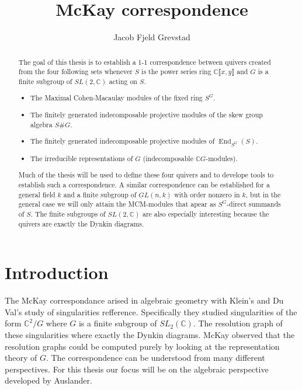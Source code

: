 \documentclass[11pt, a4paper, english]{article}
\numberwithin{prop}{section}
\numberwithin{lemma}{section}
\numberwithin{theorem}{section}
\numberwithin{defin}{section}
\numberwithin{example}{section}
\newcommand{\C}{\mathbb{C}}
\DeclareMathOperator{\End}{End}
\begin{document}
\title{McKay correspondence}
\author{Jacob Fjeld Grevstad}
\maketitle

\begin{abstract}
The goal of this thesis is to establish a 1-1 correspondence between quivers created from the four following sets whenever $S$ is the power series ring $\C \llbracket x, y \rrbracket$ and $G$ is a finite subgroup of $SL(2,\C)$ acting on $S$.
\begin{itemize}
\item The Maximal Cohen-Macaulay modules of the fixed ring $S^G$.
\item The finitely generated indecomposable projective modules of the skew group algebra $S\#G$.
\item The finitely generated indecomposable projective modules of $\End_{S^G}(S)$.
\item The irreducible representations of $G$ (indecomposable $\C G$-modules).
\end{itemize}
Much of the thesis will be used to define these four quivers and to develope tools to establish such a correspondence. A similar correspondence can be established for a general field $k$ and a finite subgroup of $GL(n, k)$ with order nonzero in $k$, but in the general case we will only attain the MCM-modules that apear as $S^G$-direct summands of $S$. The finite subgroups of $SL(2, \C)$ are also especially interesting because the quivers are exactly the Dynkin diagrams.
\end{abstract}

\tableofcontents

\section*{Introduction}
The McKay correspondance arised in algebraic geometry with Klein's and Du Val's study of singularities {\color{red} refference}. Specifically they studied singularities of the form $\C^2 / G$ where $G$ is a finite subgroup of $SL_2(\C)$. The resolution graph of these singularities where exactly the Dynkin diagrams. McKay observed that the resolution graphs could be computed purely by looking at the representation theory of $G$. The correspondence can be understood from many different perspectives. For this thesis our focus will be on the algebraic perspective developed by Auslander.
\end{document}
